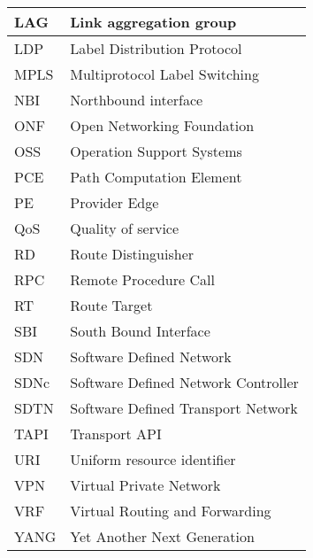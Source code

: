 \documentclass[12pt]{journalrebuttal}
\begin{document}
\begin{response}
\begin{table}[htb!]
\begin{tabular}{|l|l|}
LAG          & Link aggregation group                       \\ \hline
LDP          & Label Distribution Protocol                  \\ \hline
MPLS         & Multiprotocol Label Switching                \\ \hline
NBI          & Northbound interface                         \\ \hline
ONF          & Open Networking Foundation                   \\ \hline
OSS          & Operation Support Systems                    \\ \hline
PCE          & Path Computation Element                     \\ \hline
PE           & Provider Edge                                \\ \hline
QoS          & Quality of service                           \\ \hline
RD           & Route Distinguisher                          \\ \hline
RPC          & Remote Procedure Call                        \\ \hline
RT           & Route Target                                 \\ \hline
SBI          & South Bound Interface                        \\ \hline
SDN          & Software Defined Network                     \\ \hline
SDNc         & Software Defined Network Controller          \\ \hline
SDTN         & Software Defined Transport Network           \\ \hline
TAPI         & Transport API                                \\ \hline
URI          & Uniform resource identifier                  \\ \hline
VPN          & Virtual Private Network                      \\ \hline
VRF          & Virtual Routing and Forwarding               \\ \hline
YANG         & Yet Another Next Generation                   \\ \hline
\end{tabular}
\end{table}

\end{response}

\nextreviewer
\end{document}
